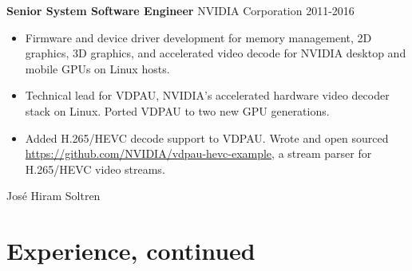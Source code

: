 \textbf{Senior System Software Engineer} NVIDIA Corporation \hfill 2011-2016

\begin{itemize} \itemsep -2pt

\item Firmware and device driver development for memory management, 2D
      graphics, 3D graphics, and accelerated video decode for NVIDIA
      desktop and mobile GPUs on Linux hosts.

\item Technical lead for VDPAU, NVIDIA's accelerated hardware video decoder
      stack on Linux. Ported VDPAU to two new GPU generations.

\item Added H.265/HEVC decode support to VDPAU. Wrote and open sourced
      \url{https://github.com/NVIDIA/vdpau-hevc-example}, a stream parser
      for H.265/HEVC video streams.

\end{itemize}

\newpage

{ \sffamily Jos\'e Hiram Soltren}

\section{Experience, continued}

